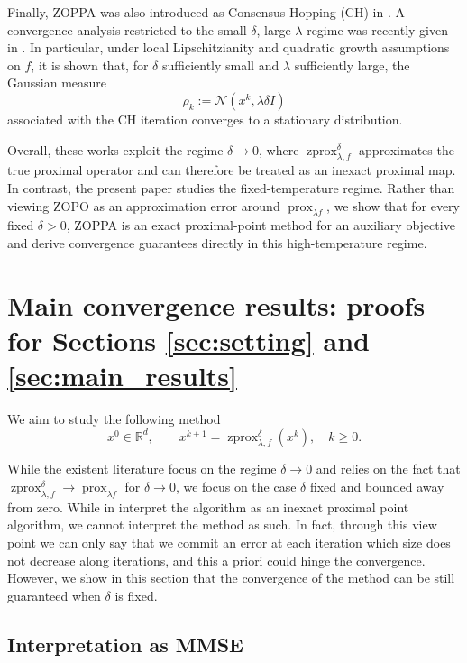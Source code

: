 \documentclass{article}
\newcommand{\R}{\mathbb{R}}
\newcommand{\prox}{\ensuremath{\operatorname{prox}}}
\newcommand{\zprox}{\ensuremath{\operatorname{zprox}}}
\begin{document}
Finally, ZOPPA was also introduced as Consensus Hopping (CH) in \cite{Fornasier2024}. A convergence analysis restricted to the small-\(\delta\), large-\(\lambda\) regime was recently given in \cite{Fornasier2026}. In particular, under local Lipschitzianity and quadratic growth assumptions on \(f\), it is shown that, for \(\delta\) sufficiently small and \(\lambda\) sufficiently large, the Gaussian measure
\[
    \rho_k:=\mathcal{N}(x^k,\lambda\delta I)
\]
associated with the CH iteration converges to a stationary distribution.

Overall, these works exploit the regime \(\delta\to0\), where \(\zprox_{\lambda,f}^{\delta}\) approximates the true proximal operator and can therefore be treated as an inexact proximal map. In contrast, the present paper studies the fixed-temperature regime. Rather than viewing ZOPO as an approximation error around \(\prox_{\lambda f}\), we show that for every fixed \(\delta>0\), ZOPPA is an exact proximal-point method for an auxiliary objective and derive convergence guarantees directly in this high-temperature regime.


\section{Main convergence results: proofs for Sections \ref{sec:setting} and \ref{sec:main_results}}

We aim to study the following method
\begin{equation}\label{eq:zprox_alg}
    x^0\in \R^d, \qquad x^{k+1} = \zprox_{\lambda, f}^\delta (x^k),\quad k \geq 0.
    \end{equation}

While the existent literature focus on the regime $\delta \to 0$ and relies on the fact that $\zprox _{\lambda, f}^\delta \to \prox_{\lambda f}$ for $\delta\to 0$, we focus on the case $\delta$ fixed and bounded away from zero. While in \cite{zhang2024inexact} interpret the algorithm as an inexact proximal point algorithm, we cannot interpret the method as such. In fact, through this view point we can only say that we commit an error at each iteration which size does not decrease along iterations, and this a priori could hinge the convergence. However, we show in this section that the convergence of the method can be still guaranteed when $\delta$ is fixed.

\subsection{Interpretation as MMSE}
\end{document}
